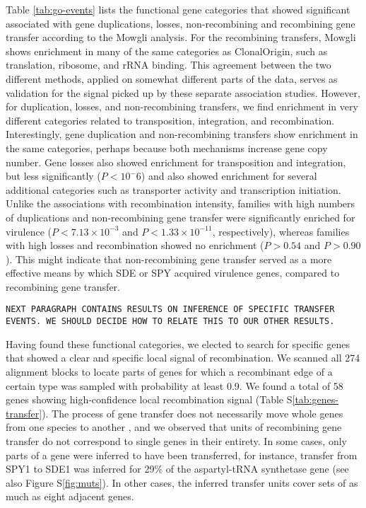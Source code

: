 \documentclass[english]{article}
\begin{document}
Table \ref{tab:go-events} lists the functional gene categories that
showed significant associated with gene duplications, losses,
non-recombining and recombining gene transfer according to the Mowgli
analysis.  For the recombining transfers, Mowgli shows enrichment in
many of the same categories as ClonalOrigin, such as translation,
ribosome, and rRNA binding.  This agreement between the two different
methods, applied on somewhat different parts of the data, serves as
validation for the signal picked up by these separate association
studies.  However, for duplication, losses, and non-recombining
transfers, we find enrichment in very different categories related to
transposition, integration, and recombination.  Interestingly, gene
duplication and non-recombining transfers show enrichment in the same
categories, perhaps because both mechanisms increase gene copy number.
Gene losses also showed enrichment for transposition and integration,
but less significantly ($P<10^-6$) and also showed enrichment for
several additional categories such as transporter activity and
transcription initiation.  Unlike the associations with recombination
intensity, families with high numbers of duplications and
non-recombining gene transfer were significantly enriched for
virulence ($P<7.13 \times 10^{-3}$ and $P<1.33 \times 10^{-11}$,
respectively), whereas families with high losses and recombination
showed no enrichment ($P>0.54$ and $P>0.90$).  This might indicate
that non-recombining gene transfer served as a more effective means by
which SDE or SPY acquired virulence genes, compared to recombining
gene transfer.

\texttt{NEXT PARAGRAPH CONTAINS RESULTS ON INFERENCE OF SPECIFIC TRANSFER 
EVENTS. WE SHOULD DECIDE HOW TO RELATE THIS TO OUR OTHER RESULTS.}

Having found these functional categories, we elected to search for specific 
genes that showed a clear and specific local signal of recombination.  We scanned 
all 274 alignment blocks to locate parts of genes for which a recombinant edge 
of a certain type was sampled with probability at least 0.9. 
We found a total of 58 genes showing high-confidence local 
recombination signal (Table S\ref{tab:genes-transfer}). The process of gene 
transfer does not necessarily move whole genes from one species to another 
\citep[e.g.,][]{Chan2009}, and we observed that units of 
recombining gene transfer do 
not correspond to single genes in their entirety. In some cases, only parts of 
a gene were inferred to have been transferred, for instance, transfer from SPY1 
to SDE1 was inferred for 29\% of the aspartyl-tRNA synthetase gene (see also 
Figure S\ref{fig:muts}). In other cases, the inferred transfer units cover sets 
of as much as eight adjacent genes.
\end{document}
